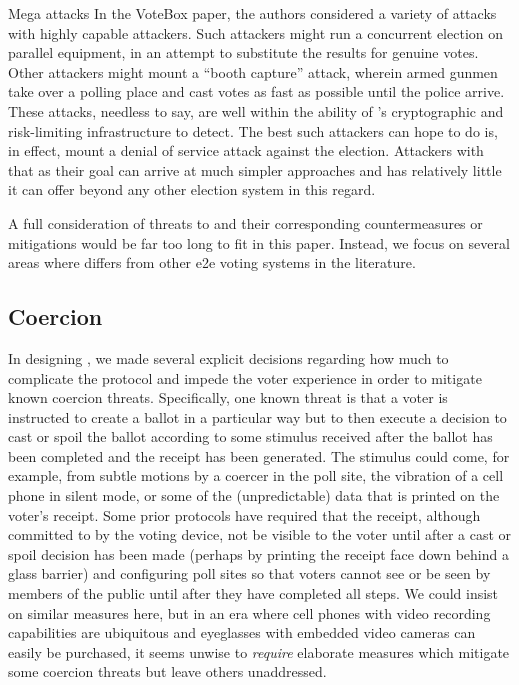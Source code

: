 \begin{compactdesc}
\item[Mega attacks]
  In the VoteBox paper, the authors considered a variety of attacks with highly capable attackers. Such attackers might run a concurrent election on parallel equipment, in an attempt to substitute the results for genuine votes. Other attackers might mount a ``booth capture'' attack, wherein armed gunmen take over a polling place and cast votes as fast as possible until the police arrive. These attacks, needless to say, are well within the ability of \projname's cryptographic and risk-limiting infrastructure to detect. The best such attackers can hope to do is, in effect, mount a denial of service attack against the election. Attackers with that as their goal can arrive at much simpler approaches and \projname has relatively little it can offer beyond any other election system in this regard.
\end{compactdesc}

A full consideration of threats to \projname and their corresponding countermeasures or mitigations would be far too long to fit in this paper. Instead, we focus on several areas where \projname differs from other e2e voting systems in the literature.

\subsection{Coercion}
\label{sec:coercion}
In designing \projname, we made several explicit decisions regarding how much to complicate the protocol and impede the voter experience in order to mitigate known coercion threats.  Specifically, one known threat is that a voter is instructed to create a ballot in a particular way but to then execute a decision to cast or spoil the ballot according to some stimulus received after the ballot has been completed and the receipt has been generated.  The stimulus could come, for example, from subtle motions by a coercer in the poll site, the vibration of a cell phone in silent mode, or some of the (unpredictable) data that is printed on the voter’s receipt.  Some prior protocols have required that the receipt, although committed to by the voting device, not be visible to the voter until after a cast or spoil decision has been made (perhaps by printing the receipt face down behind a glass barrier) and configuring poll sites so that voters cannot see or be seen by members of the public until after they have completed all steps.  We could insist on similar measures here, but in an era where cell phones with video recording capabilities are ubiquitous and eyeglasses with embedded video cameras can easily be purchased, it seems unwise to {\em require} elaborate measures which mitigate some coercion threats but leave others unaddressed.

